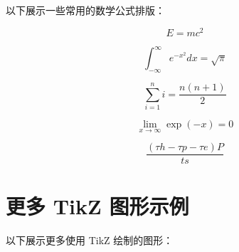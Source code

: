 \documentclass{article}
\begin{document}
以下展示一些常用的数学公式排版：

\begin{equation}
    E = mc^2
\end{equation}

\begin{equation}
    \int_{-\infty}^{\infty} e^{-x^2} dx = \sqrt{\pi}
\end{equation}

\begin{equation}
    \sum_{i=1}^{n} i = \frac{n(n+1)}{2}
\end{equation}
    
\begin{equation}
    \lim_{x \to \infty} \exp(-x) = 0
\end{equation}

\begin{equation}
    \frac{(\tau h-\tau p-\tau e)P}{ts}
\end{equation}

\section{更多 TikZ 图形示例}

以下展示更多使用 TikZ 绘制的图形：
\end{document}

